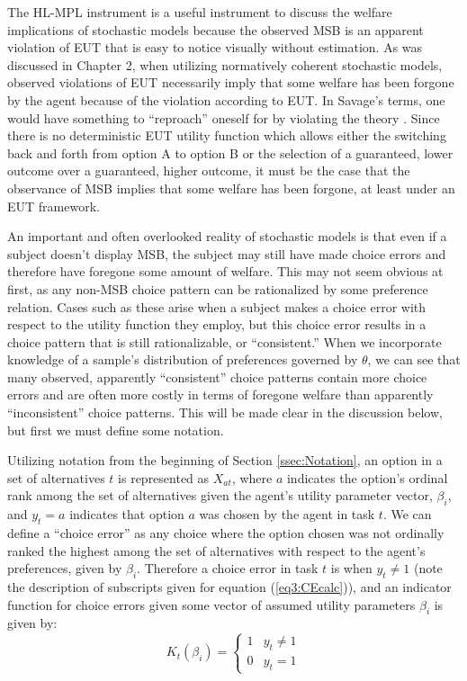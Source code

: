 \documentclass[../main.tex]{subfiles}
\begin{document}
The HL-MPL instrument is a useful instrument to discuss the welfare implications of stochastic models because the observed MSB is an apparent violation of EUT that is easy to notice visually without estimation.
As was discussed in Chapter 2, when utilizing normatively coherent stochastic models, observed violations of EUT necessarily imply that some welfare has been forgone by the agent because of the violation according to EUT.
In Savage's terms, one would have something to \enquote{reproach} oneself for by violating the theory \parencite[230]{Moscati2016}.
Since there is no deterministic EUT utility function which allows either the switching back and forth from option A to option B or the selection of a guaranteed, lower outcome over a guaranteed, higher outcome, it must be the case that the observance of MSB implies that some welfare has been forgone, at least under an EUT framework.

An important and often overlooked reality of stochastic models is that even if a subject doesn't display MSB, the subject may still have made choice errors and therefore have foregone some amount of welfare.
This may not seem obvious at first, as any non-MSB choice pattern can be rationalized by some preference relation.
Cases such as these arise when a subject makes a choice error with respect to the utility function they employ, but this choice error results in a choice pattern that is still rationalizable, or \enquote{consistent.}
When we incorporate knowledge of a sample's distribution of preferences governed by $\theta$, we can see that many observed, apparently \enquote{consistent} choice patterns contain more choice errors and are often more costly in terms of foregone welfare than apparently \enquote{inconsistent} choice patterns.
This will be made clear in the discussion below, but first we must define some notation.

Utilizing notation from the beginning of Section \ref{ssec:Notation}, an option in a set of alternatives $t$ is represented as $X_{at}$, where $a$ indicates the option's ordinal rank among the set of alternatives given the agent's utility parameter vector, $\beta_i$, and $y_t = a$ indicates that option $a$ was chosen by the agent in task $t$.
We can define a \enquote{choice error} as any choice where the option chosen was not ordinally ranked the highest among the set of alternatives with respect to the agent's preferences, given by $\beta_i$.
Therefore a choice error in task $t$ is when $y_t \neq 1$ (note the description of subscripts given for equation (\ref{eq3:CEcalc})), and an indicator function for choice errors given some vector of assumed utility parameters $\beta_i$ is given by:
\begin{equation}
	\label{eq3:Itb}
	K_{t}(\beta_i) =
	\begin{cases}
		 1 & y_t \neq 1\\
		 0 & y_t = 1
	\end{cases}
\end{equation}
\end{document}
